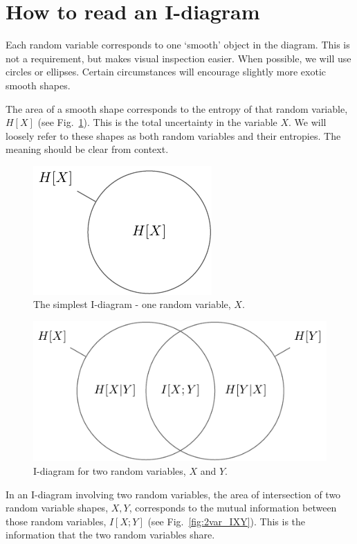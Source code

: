 \section{How to read an I-diagram}
Each random variable corresponds to one `smooth' object in the diagram. This is not a requirement, but makes visual inspection easier. When possible, we will use circles or ellipses. Certain circumstances will encourage slightly more exotic smooth shapes.

The area of a smooth shape corresponds to the entropy of that random variable, $H[X]$ (see Fig.~\ref{fig:1var_bare}). This is the total uncertainty in the variable $X$. We will loosely refer to these shapes as both random variables and their entropies. The meaning should be clear from context.

\begin{figure}[h]
\centering
\includegraphics{../appendix2/figures/tikz/1var/1var_bare}
\caption{The simplest I-diagram - one random variable, $X$.}
\label{fig:1var_bare}
\end{figure}

\begin{figure}[h]
\centering
\includegraphics{../appendix2/figures/tikz/2var/2var_bare}
\caption{I-diagram for two random variables, $X$ and $Y$.}
\label{fig:2var_bare}
\end{figure}

In an I-diagram involving two random variables, the area of intersection of two random variable shapes, $X, Y$, corresponds to the mutual information between those random variables, $I[X;Y]$ (see Fig.~\ref{fig:2var_IXY}). This is the information that the two random variables share.

